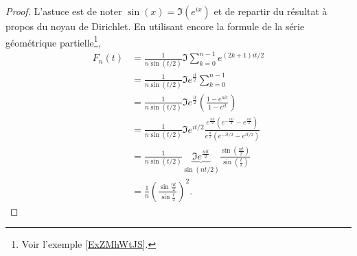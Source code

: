 \begin{proof}
    L'astuce est de noter \( \sin(x)=\Im( e^{ix})\) et de repartir du résultat à propos du noyau de Dirichlet. En utilisant encore la formule de la série géométrique partielle\footnote{Voir l'exemple \ref{ExZMhWtJS}.},
    \begin{subequations}
        \begin{align}
            F_n(t)&=\frac{1}{ n\sin(t/2) }\Im\sum_{k=0}^{n-1} e^{(2k+1)it/2}\\
            &=\frac{1}{ n\sin(t/2) }\Im e^{\frac{ it }{ 2 }}\sum_{k=0}^{n-1}\\
            &=\frac{1}{ n\sin(t/2) }\Im e^{\frac{ it }{ 2 }}\left( \frac{ 1- e^{nit} }{ 1- e^{it} } \right)\\
            &=\frac{1}{ n\sin(t/2) }\Im e^{it/2}\frac{  e^{\frac{ nit }{ 2 }}\left(  e^{-\frac{ int }{2}}- e^{\frac{ nit }{2}} \right) }{  e^{\frac{ it }{2}}\left(  e^{-it/2}- e^{it/2} \right) }\\
            &=\frac{1}{ n\sin(t/2) }\underbrace{\Im e^{\frac{ nit }{2}}}_{\sin(nt/2)}\frac{ \sin\left( \frac{ nt }{ 2 } \right) }{ \sin(\frac{ t }{2}) }\\
            &=\frac{1}{ n }\left( \frac{ \sin\frac{ nt }{2} }{ \sin\frac{ t }{2} } \right)^2.
        \end{align}
    \end{subequations}
\end{proof}


